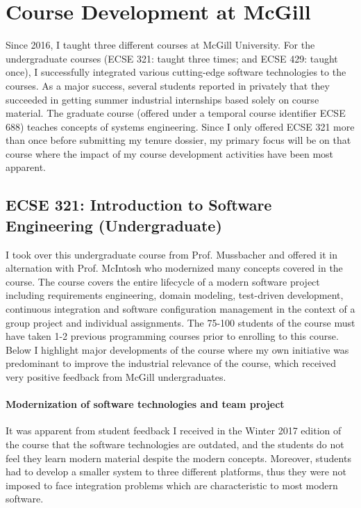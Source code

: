 \documentclass[a4paper,11pt]{article}
\begin{document}
\section{Course Development at McGill}
Since 2016, I taught three different courses at McGill University. For the undergraduate courses (ECSE 321: taught three times; and ECSE 429: taught once), I successfully integrated various cutting-edge software technologies to the courses. As a major success, several students reported in privately that they succeeded in getting summer industrial internships based solely on course material. The graduate course (offered under a temporal course identifier ECSE 688) teaches concepts of systems engineering. Since I only offered ECSE 321 more than once before submitting my tenure dossier, my primary focus will be on that course where the impact of my course development activities have been most apparent. 

\subsection{ECSE 321: Introduction to Software Engineering (Undergraduate)}
I took over this undergraduate course from Prof. Mussbacher and offered it in alternation with Prof. McIntosh who modernized many concepts covered in the course. The course covers the entire lifecycle of a modern software project including requirements engineering, domain modeling, test-driven development, continuous integration and software configuration management in the context of a group project and individual assignments. The 75-100 students of the course must have taken 1-2 previous programming courses prior to enrolling to this course. Below I highlight major developments of the course where my own initiative was predominant to improve the industrial relevance of the course, which received very positive feedback from McGill undergraduates. 

\paragraph{Modernization of software technologies and team project}
It was apparent from student feedback I received in the Winter 2017 edition of the course that the software technologies are outdated, and the students do not feel they learn modern material despite the modern concepts. Moreover, students had to develop a smaller system to three different platforms, thus they were not imposed to face integration problems which are characteristic to most modern software.
\end{document}
